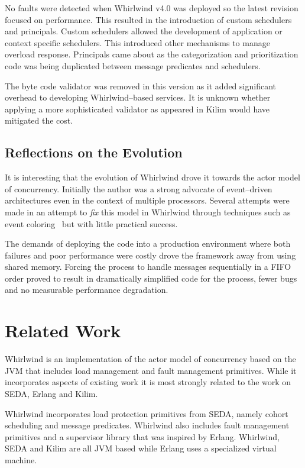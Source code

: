 \documentclass[conference]{IEEEtran}
\begin{document}
No faults were detected when Whirlwind v4.0 was deployed so the latest revision focused on performance. This resulted in the introduction of custom schedulers and principals. Custom schedulers allowed the development of application or context specific schedulers. This introduced other mechanisms to manage overload response. Principals came about as the categorization and prioritization code was being duplicated between message predicates and schedulers.

The byte code validator was removed in this version as it added significant overhead to developing Whirlwind--based services. It is unknown whether applying a more sophisticated validator as appeared in Kilim would have mitigated the cost.

\subsection{Reflections on the Evolution}

It is interesting that the evolution of Whirlwind drove it towards the actor model of concurrency. Initially the author was a strong advocate of event--driven architectures even in the context of multiple processors. Several attempts were made in an attempt to \emph{fix} this model in Whirlwind through techniques such as event coloring~\cite{Dabek02EventDriven} but with little practical success. 

The demands of deploying the code into a production environment where both failures and poor performance were costly drove the framework away from using shared memory. Forcing the process to handle messages sequentially in a FIFO order proved to result in dramatically simplified code for the process, fewer bugs and no measurable performance degradation.

\section{Related Work}

Whirlwind is an implementation of the actor model of concurrency based on the JVM that includes load management and fault management primitives. While it incorporates aspects of existing work it is most strongly related to the work on SEDA, Erlang and Kilim. 

Whirlwind incorporates load protection primitives from SEDA, namely cohort scheduling and message predicates. Whirlwind also includes fault management primitives and a supervisor library that was inspired by Erlang. Whirlwind, SEDA and Kilim are all JVM based while Erlang uses a specialized virtual machine.
\end{document}
